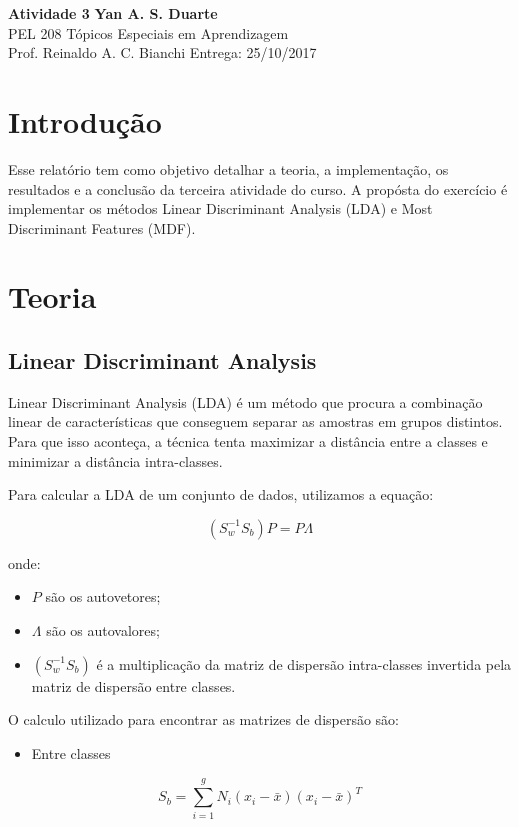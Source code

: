 \documentclass[a4paper, 11pt]{article}
\begin{document}
\noindent
\large\textbf{Atividade 3} \hfill \textbf{Yan A. S. Duarte} \\
\normalsize PEL 208 \hfill Tópicos Especiais em Aprendizagem \\
Prof. Reinaldo A. C. Bianchi \hfill Entrega: 25/10/2017 \\


\section*{Introdução}

Esse relatório tem como objetivo detalhar a teoria, a implementação, os resultados e a conclusão da terceira atividade do curso. A propósta do exercício é implementar os métodos Linear Discriminant Analysis (LDA) e Most Discriminant Features (MDF).

\section*{Teoria}
\subsection*{Linear Discriminant Analysis}
Linear Discriminant Analysis (LDA) é um método que procura a combinação linear de características que conseguem separar as amostras em grupos distintos. Para que isso aconteça, a técnica tenta maximizar a distância entre a classes e minimizar a distância intra-classes.

Para calcular a LDA de um conjunto de dados, utilizamos a equação:

$$
(S_{w}^{-1}S_b)P=P\Lambda
$$

onde:

\begin{itemize}
\item $P$ são os autovetores;
\item $ \Lambda $ são os autovalores;
\item $(S_{w}^{-1}S_b)$ é a multiplicação da matriz de dispersão intra-classes invertida pela matriz de dispersão entre classes.
\end{itemize}

O calculo utilizado para encontrar as matrizes de dispersão são:

\begin{itemize}
\item Entre classes
\end{itemize}
$$
S_b = \sum_{i=1}^{g}N_i(x_{i}-\bar{x})(x_{i}-\bar{x})^T
$$
\end{document}
